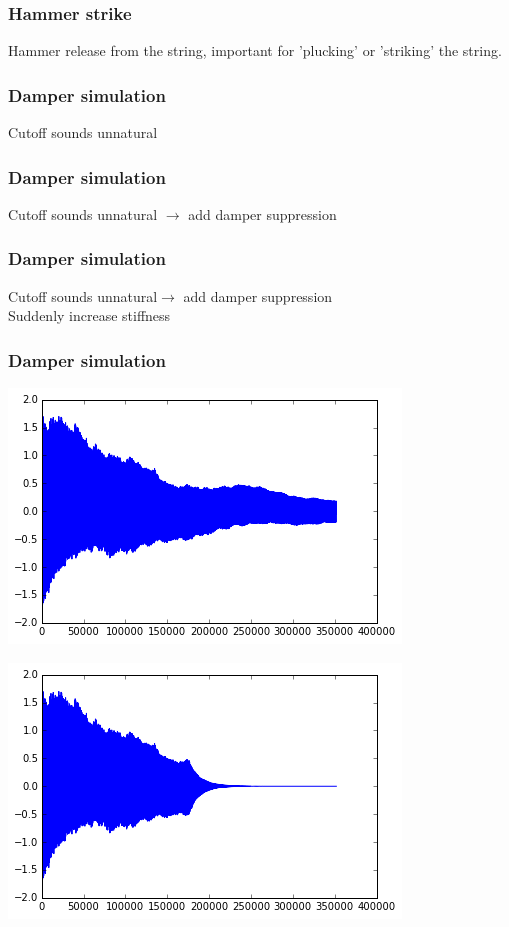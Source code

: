 \documentclass{beamer}
\begin{document}
\begin{frame}\frametitle{Hammer strike}
Hammer release from the string, important for 'plucking' or 'striking' the string.
\end{frame}


\begin{frame}\frametitle{Damper simulation}
Cutoff sounds unnatural
\end{frame}

\begin{frame}\frametitle{Damper simulation}
Cutoff sounds unnatural $\rightarrow$ add damper suppression
\end{frame}

\begin{frame}\frametitle{Damper simulation}
Cutoff sounds unnatural$\rightarrow$ add damper suppression\\
Suddenly increase stiffness
\end{frame}

\begin{frame}\frametitle{Damper simulation}

    \begin{minipage}{0.47\textwidth}
		\includegraphics[width=\textwidth]{images/normal.png}
	\end{minipage}
    \begin{minipage}{0.47\textwidth}
		\includegraphics[width=\textwidth]{images/damped.png}
	\end{minipage}
\end{frame}
\end{document}
